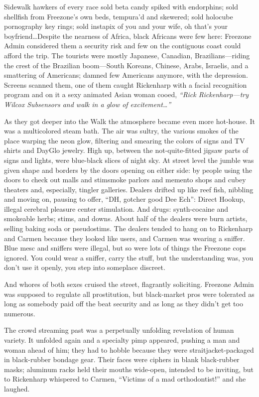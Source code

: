 Sidewalk hawkers of every race sold beta candy spiked with endorphins; sold shellfish from Freezone's own beds, tempura'd and skewered; sold holocube pornography key rings; sold instapix of you and your wife, oh that's your boyfriend\ldots Despite the nearness of Africa, black Africans were few here: Freezone Admin considered them a security risk and few on the contiguous coast could afford the trip. The tourists were mostly Japanese, Canadian, Brazilians---riding the crest of the Brazilian boom---South Koreans, Chinese, Arabs, Israelis, and a smattering of Americans; damned few Americans anymore, with the depression. Screens scanned them, one of them caught Rickenharp with a facial recognition program and on it a sexy animated Asian woman cooed, \textit{``Rick Rickenharp---try Wilcox Subsensors and walk in a glow of excitement\ldots ''}

As they got deeper into the Walk the atmosphere became even more hot-house. It was a multicolored steam bath. The air was sultry, the various smokes of the place warping the neon glow, filtering and smearing the colors of signs and TV shirts and DayGlo jewelry. High up, between the not-quite-fitted jigsaw parts of signs and lights, were blue-black slices of night sky. At street level the jumble was given shape and borders by the doors opening on either side: by people using the doors to check out malls and stimsmoke parlors and memento shops and cubey theaters and, especially, tingler galleries. Dealers drifted up like reef fish, nibbling and moving on, pausing to offer, ``DH, gotcher good Dee Ech'': Direct Hookup, illegal cerebral pleasure center stimulation. And drugs: synth-cocaine and smokeable herbs; stims, and downs. About half of the dealers were burn artists, selling baking soda or pseudostims. The dealers tended to hang on to Rickenharp and Carmen because they looked like users, and Carmen was wearing a sniffer. Blue mesc and sniffers were illegal, but so were lots of things the Freezone cops ignored. You could wear a sniffer, carry the stuff, but the understanding was, you don't use it openly, you step into someplace discreet.

And whores of both sexes cruised the street, flagrantly soliciting. Freezone Admin was supposed to regulate all prostitution, but black-market pros were tolerated as long as somebody paid off the beat security and as long as they didn't get too numerous.

The crowd streaming past was a perpetually unfolding revelation of human variety. It unfolded again and a specialty pimp appeared, pushing a man and woman ahead of him; they had to hobble because they were straitjacket-packaged in black-rubber bondage gear. Their faces were ciphers in blank black-rubber masks; aluminum racks held their mouths wide-open, intended to be inviting, but to Rickenharp whispered to Carmen, ``Victims of a mad orthodontist!'' and she laughed.

